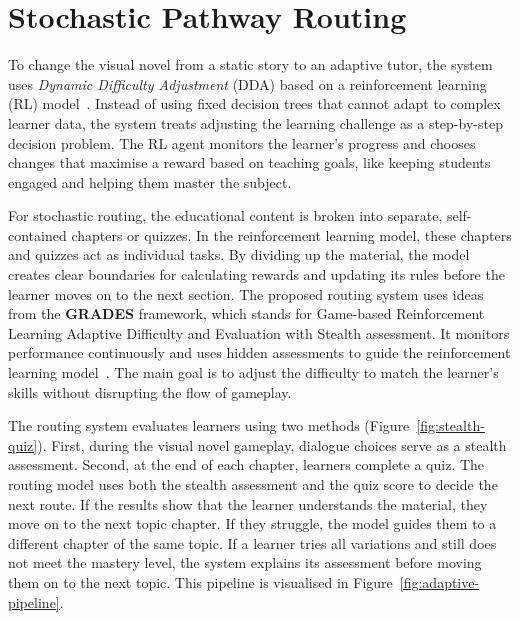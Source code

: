 \documentclass[12pt,a4paper]{report}
\begin{document}
\section{Stochastic Pathway Routing}

\quad To change the visual novel from a static story to an adaptive tutor, the system uses \textit{Dynamic Difficulty Adjustment} (DDA) based on a reinforcement learning (RL) model~\cite{7}. Instead of using fixed decision trees that cannot adapt to complex learner data, the system treats adjusting the learning challenge as a step-by-step decision problem. The RL agent monitors the learner's progress and chooses changes that maximise a reward based on teaching goals, like keeping students engaged and helping them master the subject.

\quad For stochastic routing, the educational content is broken into separate, self-contained chapters or quizzes. In the reinforcement learning model, these chapters and quizzes act as individual tasks. By dividing up the material, the model creates clear boundaries for calculating rewards and updating its rules before the learner moves on to the next section. The proposed routing system uses ideas from the \textbf{GRADES} framework, which stands for Game-based Reinforcement Learning Adaptive Difficulty and Evaluation with Stealth assessment. It monitors performance continuously and uses hidden assessments to guide the reinforcement learning model~\cite{14}. The main goal is to adjust the difficulty to match the learner's skills without disrupting the flow of gameplay.

\quad The routing system evaluates learners using two methods (Figure~\ref{fig:stealth-quiz}). First, during the visual novel gameplay,  dialogue choices serve as a stealth assessment. Second, at the end of each chapter, learners complete a quiz. The routing model uses both the stealth assessment and the quiz score to decide the next route. If the results show that the learner understands the material, they move on to the next topic chapter. If they struggle, the model guides them to a different chapter of the same topic. If a learner tries all variations and still does not meet the mastery level, the system explains its assessment before moving them on to the next topic. This pipeline is visualised in Figure~\ref{fig:adaptive-pipeline}.

\vspace{3em}
\end{document}
